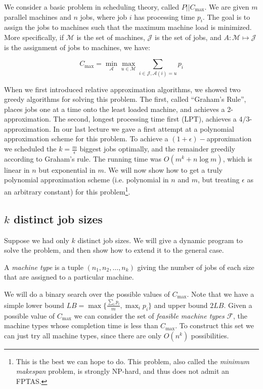 \documentclass{article}
\begin{document}
We consider a basic problem in scheduling theory, called $P ||
C_{\textrm{max}}$. We are given $m$ parallel machines and $n$ jobs,
where job $i$ has processing time $p_i$. The goal is to assign the
jobs to machines such that the maximum machine load is minimized. More
specifically, if $\mathcal{M}$ is the set of machines, $\mathcal{J}$
is the set of jobs, and $A : \mathcal{M} \mapsto \mathcal{J}$ is the
assignment of jobs to machines, we have:

$$C_{\textrm{max}} = \min_{\mathcal{A}} \max_{u \in \mathcal{M}} \sum_{i\in \mathcal{J}, \mathcal{A}(i)=u}{p_i}$$

When we first introduced relative approximation algorithms, we showed
two greedy algorithms for solving this problem. The first, called
``Graham's Rule'', places jobs one at a time onto the least loaded
machine, and achieves a 2-approximation. The second, longest
processing time first (LPT), achieves a $4/3$-approximation. In our
last lecture we gave a first attempt at a polynomial approximation
scheme for this problem. To achieve a $(1+\epsilon)-$approximation we
scheduled the $k=\frac{m}{\epsilon}$ biggest jobs optimally, and the
remainder greedily according to Graham's rule. The running time was
$O(m^k + n\log{m})$, which is linear in $n$ but exponential in $m$. We
will now show how to get a truly polynomial approximation scheme
(i.e. polynomial in $n$ and $m$, but treating $\epsilon$ as an
arbitrary constant) for this problem\footnote{This is the best we can
hope to do. This problem, also called the {\em minimum makespan}
problem, is strongly NP-hard, and thus does not admit an FPTAS.}.

\subsection{$k$ distinct job sizes}

Suppose we had only $k$ distinct job sizes. We will give a dynamic
program to solve the problem, and then show how to extend it to the
general case.

\begin{definition}
A {\em machine type} is a tuple $(n_1, n_2, \ldots, n_k)$ giving the
number of jobs of each size that are assigned to a particular machine.
\end{definition}

We will do a binary search over the possible values of
$C_{\textrm{max}}$. Note that we have a simple lower bound $LB
=\max\{\frac{\sum_i{p_i}}{m}, \max_i{p_i}\}$ and upper bound $2
LB$. Given a possible value of $C_{\textrm{max}}$ we can consider the
set of {\em feasible machine types} $\mathcal{F}$, the machine types
whose completion time is less than $C_{\textrm{max}}$. To construct
this set we can just try all machine types, since there are only
$O(n^k)$ possibilities.
\end{document}
